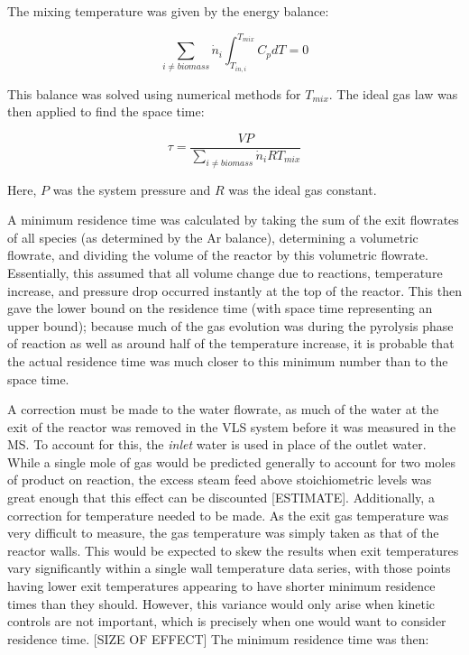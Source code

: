 \documentclass[11pt,twocolumn]{article}
\begin{document}
The mixing temperature was given by the energy balance:

\begin{equation}
	\sum_{i \ne biomass}\dot{n}_{i}\int_{T_{in,i}}^{T_{mix}}C_{p}dT = 0
\end{equation}

This balance was solved using numerical methods for $T_{mix}$. The ideal gas law was then applied to find the space time:

\begin{equation}
	\tau = \frac{VP}{\sum_{i \ne biomass}\dot{n}_{i}RT_{mix}}
\end{equation}

Here, $P$ was the system pressure and $R$ was the ideal gas constant.

A minimum residence time was calculated by taking the sum of the exit flowrates of all species (as determined by the Ar balance), determining a volumetric flowrate, and dividing the volume of the reactor by this volumetric flowrate.  Essentially, this assumed that all volume change due to reactions, temperature increase, and pressure drop occurred instantly at the top of the reactor.  This then gave the lower bound on the residence time (with space time representing an upper bound); because much of the gas evolution was during the pyrolysis phase of reaction as well as around half of the temperature increase, it is probable that the actual residence time was much closer to this minimum number than to the space time.  

A correction must be made to the water flowrate, as much of the water at the exit of the reactor was removed in the VLS system before it was measured in the MS.  To account for this, the \emph{inlet} water is used in place of the outlet water.  While a single mole of gas would be predicted generally to account for two moles of product on reaction, the excess steam feed above stoichiometric levels was great enough that this effect can be discounted [ESTIMATE].  Additionally, a correction for temperature needed to be made.  As the exit gas temperature was very difficult to measure, the gas temperature was simply taken as that of the reactor walls.  This would be expected to skew the results when exit temperatures vary significantly within a single wall temperature data series, with those points having lower exit temperatures appearing to have shorter minimum residence times than they should.  However, this variance would only arise when kinetic controls are not important, which is precisely when one would want to consider residence time. [SIZE OF EFFECT]  The minimum residence time was then:
\end{document}
